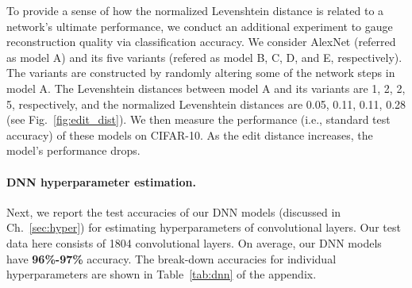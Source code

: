 \documentclass[12pt]{report}
\begin{document}
To provide a sense of how the normalized Levenshtein distance is related to a network's ultimate performance, we
conduct an additional experiment to gauge reconstruction quality via classification accuracy.
We consider AlexNet (referred as model \textsf{A}) and its
five variants (refered as model \textsf{B}, \textsf{C}, \textsf{D}, and \textsf{E}, respectively).
The variants are constructed by randomly altering some of the network steps in model \textsf{A}.
The Levenshtein distances between model \textsf{A} and its variants are 1, 2, 2, 5, 
respectively, and the normalized Levenshtein distances 
are 0.05, 0.11, 0.11, 0.28 (see Fig.~\ref{fig:edit_dist}). 
We then measure the performance (i.e., standard test accuracy) of these models
on CIFAR-10. As the edit distance increases, the model's performance drops.

\paragraph{DNN hyperparameter estimation.}
Next, we report the test accuracies of our DNN models (discussed in
Ch.~\ref{sec:hyper}) for estimating hyperparameters of convolutional layers. 
Our test data here consists of 1804 convolutional layers. On average, our DNN
models have \textbf{96\%-97\%} accuracy.  The break-down accuracies for
individual hyperparameters are shown in Table~\ref{tab:dnn} of the appendix.
\end{document}
